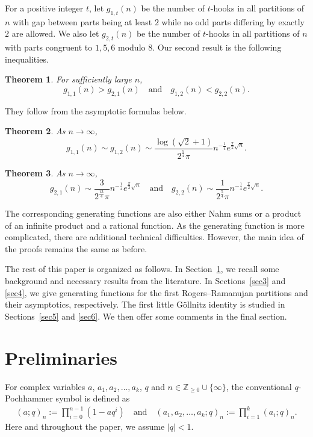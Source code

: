 \documentclass[11pt,reqno]{amsart}
\newtheorem{theorem}{Theorem}[section]
\theoremstyle{remark}
\numberwithin{equation}{section}
\begin{document}
For a positive integer $t$, let $g_{1,t}(n)$ be the number of $t$-hooks in all partitions of $n$ with gap between parts being at least $2$ while no odd parts differing by exactly $2$ are allowed. We also let $g_{2,t}(n)$ be the number of $t$-hooks in all partitions of $n$ with parts congruent to $1,5, 6$ modulo $8$.  Our second result is the following inequalities. 

\begin{theorem}\label{thm:g_ineq}
	For sufficiently large $n$,
	\[
		g_{1,1}(n) > g_{2,1}(n) \quad \text{and}\quad  g_{1,2}(n) < g_{2,2}(n).
	\]
\end{theorem}
They follow from the asymptotic formulas below. 
\begin{theorem}\label{thm:g1_asymp}
	As $n \to \infty$,
	\[
		g_{1,1}(n) \sim g_{1,2}(n) \sim \frac{\log(\sqrt{2}+1) }{2^{\frac54}\pi } n^{-\frac14} e^{\frac{\pi}{2} \sqrt{n}}.
	\]
\end{theorem}

\begin{theorem}\label{thm:g2_asymp}
	As $n \to \infty$,
	\[
		g_{2,1}(n) \sim \frac{3}{2^{\frac{13}{4}}\pi} n^{-\frac14} e^{\frac{\pi}{2} \sqrt{n}} \quad \text{and} \quad g_{2,2}(n) \sim  \frac{1}{2^{\frac{5}{4}}\pi} n^{-\frac14} e^{\frac{\pi}{2} \sqrt{n}} .
	\]
\end{theorem}


The corresponding generating functions are also either Nahm sums or a product of an infinite product and a rational function. As the generating function is more complicated, there are additional technical difficulties. However, the main idea of the proofs remains the same as before.


The rest of this paper is organized as follows. In Section~\ref{sec2}, we recall some background and necessary results from the literature. In Sections~\ref{sec3} and \ref{sec4}, we give generating functions for the first Rogers--Ramanujan partitions and their asymptotics, respectively.  The first little G\"ollnitz identity is studied in Sections~\ref{sec5} and \ref{sec6}. We then offer some  comments in the final section. 


\section{Preliminaries}\label{sec2}

For complex variables $a$, $a_1,a_2,\ldots,a_k$, $q$ and $n \in \mathbb{Z}_{\ge 0} \cup \{\infty\}$, the conventional $q$-Pochhammer symbol is defined as
\begin{align*}
(a;q)_n := \prod\limits_{i=0}^{n-1}(1-aq^i)\quad\text{and}\quad (a_1,a_2,\ldots,a_k;q)_n := \prod\limits_{i=1}^{k}(a_i;q)_n.
\end{align*}
Here and throughout the paper, we assume $|q|<1$.
\end{document}
